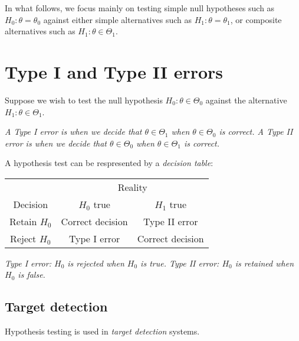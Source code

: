 \vspace*{2ex}
In what follows, we focus mainly on testing simple null hypotheses such as $H_0:\theta=\theta_0$ against either simple alternatives such as $H_1:\theta=\theta_1$, or composite alternatives such as $H_1:\theta\in\Theta_1$.



\section{Type I and Type II errors}
Suppose we wish to test the null hypothesis $H_0:\theta\in\Theta_0$ against the alternative $H_1:\theta\in\Theta_1$.

\bit
\it A \emph{Type I error} is when we decide that $\theta\in\Theta_1$ when $\theta\in\Theta_0$ is correct.
\it A \emph{Type II error} is when we decide that $\theta\in\Theta_0$ when $\theta\in\Theta_1$ is correct.
\eit

\vspace*{2ex}
A hypothesis test can be respresented by a \emph{decision table}:

\vspace*{2ex}
\begin{minipage}{\linewidth}\centering
\begin{tabular}{|c|c|c|} \hline
				& \multicolumn{2}{c|}{Reality} \\ 
Decision		& $H_0$ true			& $H_1$ true \\ \hline
Retain $H_0$	& Correct decision 	& Type II error \\ 
Reject $H_0$	& Type I error 		& Correct decision \\ \hline
\end{tabular}
\end{minipage}

\vspace*{2ex}
\bit
\it Type I error: $H_0$ is rejected when $H_0$ is true.
\it Type II error: $H_0$ is retained when $H_0$ is false.
\eit


\subsection{Target detection}
Hypothesis testing is used in \emph{target detection} systems. 

